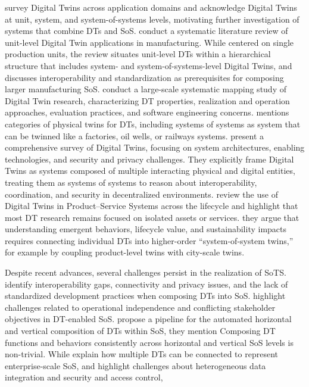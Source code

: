 \textcite{semeraro2021digital} survey Digital Twins across application domains and acknowledge Digital Twins at unit, system, and system-of-systems levels, motivating further investigation of systems that combine DTs and SoS.
\textcite{bottjer2023review} conduct a systematic literature review of unit-level Digital Twin applications in manufacturing. While centered on single production units, the review situates unit-level DTs within a hierarchical structure that includes system- and system-of-systems-level Digital Twins, and discusses interoperability and standardization as prerequisites for composing larger manufacturing SoS.
\textcite{dalibor2022cross} conduct a large-scale systematic mapping study of Digital Twin research, characterizing DT properties, realization and operation approaches, evaluation practices, and software engineering concerns. mentions categories of physical twins for DTs, including systems of systems as system that can be twinned like a factories, oil wells, or railways systems.
\textcite{mihai2022digital} present a comprehensive survey of Digital Twins, focusing on system architectures, enabling technologies, and security and privacy challenges. They explicitly frame Digital Twins as systems composed of multiple interacting physical and digital entities, treating them as systems of systems to reason about interoperability, coordination, and security in decentralized environments.
\textcite{bertoni2022designing} review the use of Digital Twins in Product–Service Systems across the lifecycle and highlight that most DT research remains focused on isolated assets or services. they argue that understanding emergent behaviors, lifecycle value, and sustainability impacts requires connecting individual DTs into higher-order “system-of-system twins,” for example by coupling product-level twins with city-scale twins.



Despite recent advances, several challenges persist in the realization of SoTS. \textcite{michael2022integration} identify interoperability gaps, connectivity and privacy issues, and the lack of standardized development practices when composing DTs into SoS. \textcite{borth2019digital} highlight challenges related to operational independence and conflicting stakeholder objectives in DT-enabled SoS. \textcite{gill2024toward} propose a pipeline for the automated horizontal and vertical composition of DTs within SoS, they mention Composing DT functions and behaviors consistently across horizontal and vertical SoS levels is non-trivial. While \textcite{dietz2020digital} explain how multiple DTs can be connected to represent enterprise-scale SoS, and highlight challenges about  heterogeneous data integration and security and access control,


